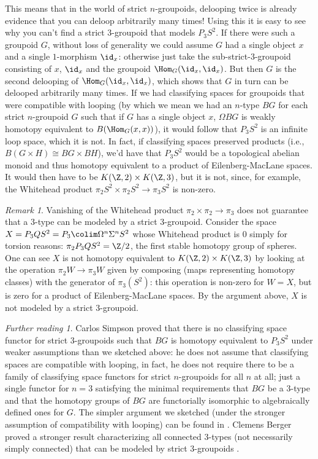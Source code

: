 \documentclass{conm-p-l}
\theoremstyle{definition} \newtheorem{definition}[theorem]{Definition}
\theoremstyle{remark} \newtheorem{remark}[theorem]{Remark}
\newtheorem*{further}{Further reading}
\numberwithin{equation}{section}
\begin{document}
This means that in the world of strict $n$-groupoids, delooping twice
is already evidence that you can deloop arbitrarily many times! Using
this it is easy to see why you can't find a strict $3$-groupoid that
models $P_3 S^2$. If there were such a groupoid $G$, without loss of
generality we could assume $G$ had a single object $x$ and a single
$1$-morphism $\id_x$: otherwise just take the sub-strict-$3$-groupoid
consisting of $x$, $\id_x$ and the groupoid $\Hom_G(\id_x, \id_x)$.
But then $G$ is the second delooping of $\Hom_G(\id_x, \id_x)$, which
shows that $G$ in turn can be delooped arbitrarily many times. If we
had classifying spaces for groupoids that were compatible with looping
(by which we mean we had an $n$-type $BG$ for each strict $n$-groupoid
$G$ such that if $G$ has a single object $x$, $\Omega BG$ is weakly
homotopy equivalent to $B(\Hom_G(x,x))$), it would follow that $P_3
S^2$ is an infinite loop space, which it is not. In fact, if
classifying spaces preserved products (i.e., $B(G \times H) \cong BG
\times BH$), we'd have that $P_3 S^2$ would be a topological abelian
monoid and thus homotopy equivalent to a product of Eilenberg-MacLane
spaces. It would then have to be $K(\Z,2) \times K(\Z,3)$, but it is
not, since, for example, the Whitehead product $\pi_2 S^2 \times \pi_2
S^2 \to \pi_3 S^2$ is non-zero.

\begin{remark} Vanishing of the Whitehead product $\pi_2 \times \pi_2
\to \pi_3$ does not guarantee that a $3$-type can be modeled by a
strict $3$-groupoid. Consider the space $X = P_3 Q S^2 = P_3 \colim
\Omega^n \Sigma^n S^2$ whose Whitehead product is $0$ simply for
torsion reasons: $\pi_2 P_3QS^2 = \Z/2$, the first stable homotopy
group of spheres. One can see $X$ is not homotopy equivalent to
$K(\Z,2) \times K(\Z,3)$ by looking at the operation $\pi_2 W \to
\pi_3 W$ given by composing (maps representing homotopy classes) with
the generator of $\pi_3(S^2)$: this operation is non-zero for $W=X$,
but is zero for a product of Eilenberg-MacLane spaces. By the argument
above, $X$ is not modeled by a strict $3$-groupoid. \end{remark}

\begin{further} Carlos Simpson \cite[Section 2.7]{Simpson} proved that
there is no classifying space functor for strict $3$-groupoids such
that $BG$ is homotopy equivalent to $P_3S^2$ under weaker assumptions
than we sketched above: he does not assume that classifying spaces are
compatible with looping, in fact, he does not require there to be a
family of classifying space functors for strict $n$-groupoids for all
$n$ at all; just a single functor for $n=3$ satisfying the minimal
requirements that $BG$ be a $3$-type and that the homotopy groups of
$BG$ are functorially isomorphic to algebraically defined ones for
$G$. The simpler argument we sketched (under the stronger assumption
of compatibility with looping) can be found in \cite[Section
2.6]{Simpson}. Clemens Berger proved a stronger result characterizing
all connected $3$-types (not necessarily simply connected) that can be
modeled by strict $3$-groupoids \cite[Corollary 3.4]{Berger}.
\end{further}
\end{document}
